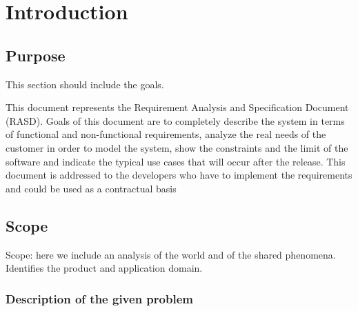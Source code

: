 \section{Introduction}
\label{sect:introduction}

\subsection{Purpose}
\label{subsect:purpose}

This section should include the goals.

This document represents the Requirement Analysis and Specification Document (RASD). Goals of this document are to completely describe the system in terms of functional and non-functional requirements, analyze the real needs of the customer in order to model the system, show the constraints and the limit of the software and indicate the typical use cases that will occur after the release. This document is addressed to the developers who have to implement the requirements and could be used as a contractual basis

\subsection{Scope}
\label{subsect:scope}

Scope: here we include an analysis of the world and of the shared phenomena. Identifies the product and application domain.

\subsubsection{Description of the given problem}
\label{subsect:descriptionofthegivenproblem}

